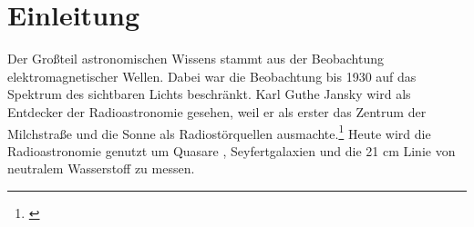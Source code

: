 \section{Einleitung}
Der Großteil astronomischen Wissens stammt aus der Beobachtung elektromagnetischer Wellen. Dabei war die Beobachtung bis 1930 auf das Spektrum des sichtbaren Lichts beschränkt. Karl Guthe Jansky wird als Entdecker der Radioastronomie gesehen, weil er als erster das Zentrum der Milchstraße und die Sonne als Radiostörquellen ausmachte.\footnote{\cite{sky}} Heute wird die Radioastronomie genutzt um Quasare , Seyfertgalaxien und die 21 cm Linie von neutralem Wasserstoff zu messen.
